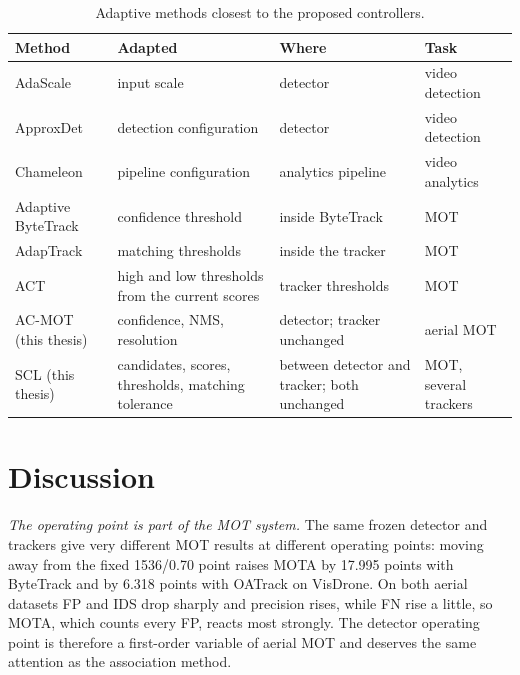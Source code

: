 \begin{table}[tbp]
\centering
\caption{Adaptive methods closest to the proposed controllers.}
\label{tab:res-properties}
\begin{tabular}{>{\raggedright\arraybackslash}p{3.4cm}>{\raggedright\arraybackslash}p{4.2cm}>{\raggedright\arraybackslash}p{3.9cm}>{\raggedright\arraybackslash}p{2.9cm}}
\toprule
Method & Adapted & Where & Task\\
\midrule
AdaScale \cite{chin2019adascale} & input scale & detector & video detection\\
ApproxDet \cite{xu2020approxdet} & detection configuration & detector & video detection\\
Chameleon \cite{jiang2018chameleon} & pipeline configuration & analytics pipeline & video analytics\\
Adaptive ByteTrack \cite{ma2023adaptivebytetrack} & confidence threshold & inside ByteTrack & MOT\\
AdapTrack \cite{shim2024adaptrack} & matching thresholds & inside the tracker & MOT\\
ACT \cite{act2026adaptive} & high and low thresholds from the current scores & tracker thresholds & MOT\\
AC-MOT (this thesis) & confidence, NMS, resolution & detector; tracker unchanged & aerial MOT\\
SCL (this thesis) & candidates, scores, thresholds, matching tolerance & between detector and tracker; both unchanged & MOT, several trackers\\
\bottomrule
\end{tabular}
\end{table}

\section{Discussion}\label{sec:res-discussion}

\emph{The operating point is part of the MOT system.} The same frozen detector and trackers give very different MOT results at different operating points: moving away from the fixed 1536/0.70 point raises MOTA by 17.995 points with ByteTrack and by 6.318 points with OATrack on VisDrone. On both aerial datasets FP and IDS drop sharply and precision rises, while FN rise a little, so MOTA, which counts every FP, reacts most strongly. The detector operating point is therefore a first-order variable of aerial MOT and deserves the same attention as the association method.

